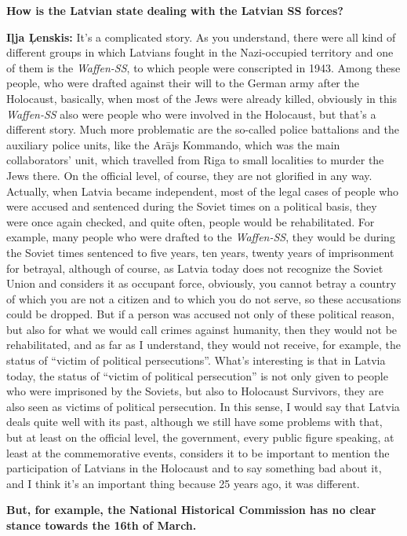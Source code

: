 \textbf{How is the Latvian state dealing with the Latvian SS forces?}

\textbf{Iļja Ļenskis:} It’s a complicated story. As you understand, there were all kind of different groups in which Latvians fought in the Nazi-occupied territory and one of them is the \textit{Waffen-SS}, to which people were conscripted in 1943. Among these people, who were drafted against their will to the German army after the Holocaust, basically, when most of the Jews were already killed, obviously in this \textit{Waffen-SS} also were people who were involved in the Holocaust, but that’s a different story. Much more problematic are the so-called police battalions and the auxiliary police units, like the Arājs Kommando, which was the main collaborators’ unit, which travelled from Riga to small localities to murder the Jews there. On the official level, of course, they are not glorified in any way. Actually, when Latvia became independent, most of the legal cases of people who were accused and sentenced during the Soviet times on a political basis, they were once again checked, and quite often, people would be rehabilitated. For example, many people who were drafted to the \textit{Waffen-SS}, they would be during the Soviet times sentenced to five years, ten years, twenty years of imprisonment for betrayal, although of course, as Latvia today does not recognize the Soviet Union and considers it as occupant force, obviously, you cannot betray a country of which you are not a citizen and to which you do not serve, so these accusations could be dropped. But if a person was accused not only of these political reason, but also for what we would call crimes against humanity, then they would not be rehabilitated, and as far as I understand, they would not receive, for example, the status of ``victim of political persecutions''. What’s interesting is that in Latvia today, the status of ``victim of political persecution'' is not only given to people who were imprisoned by the Soviets, but also to Holocaust Survivors, they are also seen as victims of political persecution. In this sense, I would say that Latvia deals quite well with its past, although we still have some problems with that, but at least on the official level, the government, every public figure speaking, at least at the commemorative events, considers it to be important to mention the participation of Latvians in the Holocaust and to say something bad about it, and I think it's an important thing because 25 years ago, it was different. 

\textbf{But, for example, the National Historical Commission has no clear stance towards the 16th of March.}

